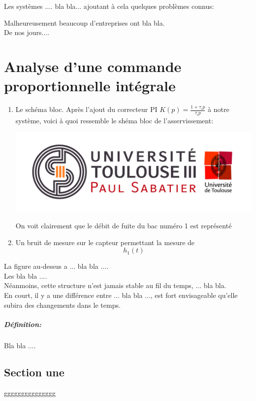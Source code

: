 \documentclass[12pt, a4paper, openany]{report}
\begin{document}
   Les systèmes .... bla bla... ajoutant à cela quelques problèmes connus:
    
   Malheureusement beaucoup d'entreprises ont bla bla. \\
   
   De nos jours....
   

\chapter{Analyse d'une commande proportionnelle intégrale}

 \begin{enumerate}
      \item Le schéma bloc.
       Après l'ajout du correcteur PI $K(p)=\frac {1+\tau_{i}p}{\tau_{i}p}$ à notre système, voici à quoi ressemble le       shéma bloc de l'asservissement:
       
 \begin{center}
   \includegraphics[scale=0.5]{Logo_UT3.jpg}
   \label{fig2}
 \end{center}    
 
 On voit clairement que le débit de fuite du bac numéro 1 est représenté    
       
      \item Un bruit de mesure sur le capteur permettant la mesure de\[h_{1}(t)\]
  \end{enumerate}
 
 
 
 
 
 La figure au-dessus a ... bla bla ....\\
 
 Les bla bla ....\\
 
 Néanmoins, cette structure n’est jamais stable au fil du temps, ... bla bla.\\
  
 En court, il y a une différence entre ... bla bla ..., est fort envisageable qu’elle subira des changements dans le temps.
 
 \paragraph{Définition:}
  Bla bla ....

 \section{Section une}
  ggggggggggggggg
\end{document}
